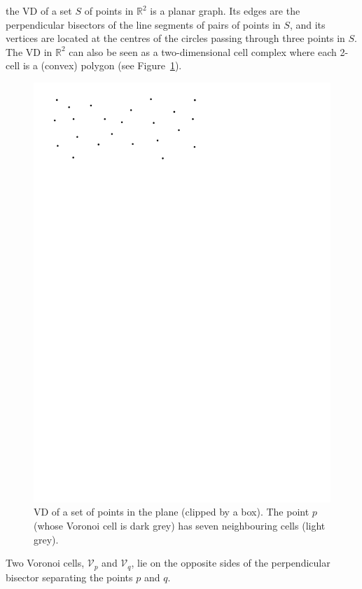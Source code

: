 the VD of a set $S$ of points in $\mathbb{R}^2$ is a planar graph. 
Its edges are the perpendicular bisectors of the line segments of pairs of points in $S$, and its vertices are located at the centres of the circles passing through three points in $S$. 
The VD in $\mathbb{R}^2$ can also be seen as a two-dimensional cell complex where each 2-cell is a (convex) polygon (see Figure~\ref{fig:vd2d}). 
\begin{figure}
  \centering
  \includegraphics[page=3,width=\textwidth]{vd2d}
  \caption{VD of a set of points in the plane (clipped by a box). The point $p$ (whose Voronoi cell is dark grey) has seven neighbouring cells (light grey).}%
\label{fig:vd2d}
\end{figure}
Two Voronoi cells, $\mathcal{V}_{p}$ and $\mathcal{V}_{q}$, lie on the opposite sides of the perpendicular bisector separating the points $p$ and $q$. 

